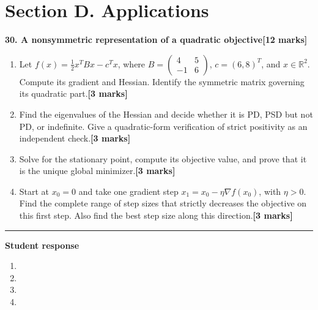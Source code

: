 \documentclass[11pt,a4paper]{article}
\newlength{\BlankAnswerHeight}\setlength{\BlankAnswerHeight}{16mm}
\newcommand{\AnswerBlank}{\leavevmode\par\vspace{\BlankAnswerHeight}}
\begin{document}
\newpage\section*{Section D. Applications}
\textbf{30. A nonsymmetric representation of a quadratic objective}\hfill\textbf{[12 marks]}\par\medskip
\begin{enumerate}[label=(\alph*),leftmargin=8mm,itemsep=3pt]
\item Let \(f(x)=\tfrac12x^TBx-c^Tx\), where \(B=\begin{pmatrix}4&5\\-1&6\end{pmatrix}\), \(c=(6,8)^T\), and \(x\in\mathbb R^2\). Compute its gradient and Hessian. Identify the symmetric matrix governing its quadratic part.\hfill\textbf{[3 marks]}
\item Find the eigenvalues of the Hessian and decide whether it is PD, PSD but not PD, or indefinite. Give a quadratic-form verification of strict positivity as an independent check.\hfill\textbf{[3 marks]}
\item Solve for the stationary point, compute its objective value, and prove that it is the unique global minimizer.\hfill\textbf{[3 marks]}
\item Start at \(x_0=0\) and take one gradient step \(x_1=x_0-\eta\nabla f(x_0)\), with \(\eta>0\). Find the complete range of step sizes that strictly decreases the objective on this first step. Also find the best step size along this direction.\hfill\textbf{[3 marks]}
\end{enumerate}\par\medskip\hrule\medskip\textbf{Student response}\par
\begin{enumerate}[label=(\alph*),leftmargin=8mm,itemsep=3pt]
\item
\AnswerBlank
\item
\AnswerBlank
\item
\AnswerBlank
\item
\AnswerBlank
\end{enumerate}
\end{document}

